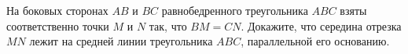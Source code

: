 \begin{ex}
	\begin{condition}
		На боковых сторонах \( AB  \) и \( BC  \) равнобедренного треугольника \( ABC  \) взяты соответственно точки \( M  \) и \( N  \) так, что \( BM = CN \). Докажите, что середина отрезка \( MN  \) лежит	на средней линии треугольника \( ABC \), параллельной его основанию.
	\end{condition}
\end{ex}